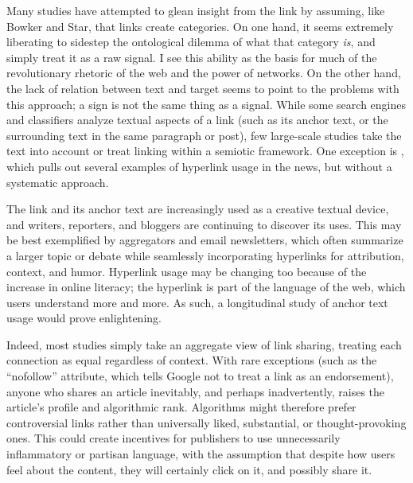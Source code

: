 Many studies have attempted to glean insight from the link by assuming, like Bowker and Star, that links create categories. On one hand, it seems extremely liberating to sidestep the ontological dilemma of what that category \emph{is}, and simply treat it as a raw signal. I see this ability as the basis for much of the revolutionary rhetoric of the web and the power of networks. %
On the other hand, the lack of relation between text and target seems to point to the problems with this approach; a sign is not the same thing as a signal. While some search engines and classifiers analyze textual aspects of a link (such as its anchor text, or the surrounding text in the same paragraph or post), few large-scale studies take the text into account or treat linking within a semiotic framework. One exception is %
, which pulls out several examples of hyperlink usage in the news, but without a systematic approach.

The link and its anchor text are increasingly used as a creative textual device, and writers, reporters, and bloggers are continuing to discover its uses. This may be best exemplified by aggregators and email newsletters, which often summarize a larger topic or debate while seamlessly incorporating hyperlinks for attribution, context, and humor. Hyperlink usage may be changing too because of the increase in online literacy; the hyperlink is part of the language of the web, which users understand more and more. As such, a longitudinal study of anchor text usage would prove enlightening.

Indeed, most studies simply take an aggregate view of link sharing, treating each connection as equal regardless of context. With rare exceptions (such as the ``nofollow'' attribute, which tells Google not to treat a link as an endorsement), anyone who shares an article inevitably, and perhaps inadvertently, raises the article's profile and algorithmic rank. Algorithms might therefore prefer controversial links rather than universally liked, substantial, or thought-provoking ones. This could create incentives for publishers to use unnecessarily inflammatory or partisan language, with the assumption that despite how users feel about the content, they will certainly click on it, and possibly share it.

